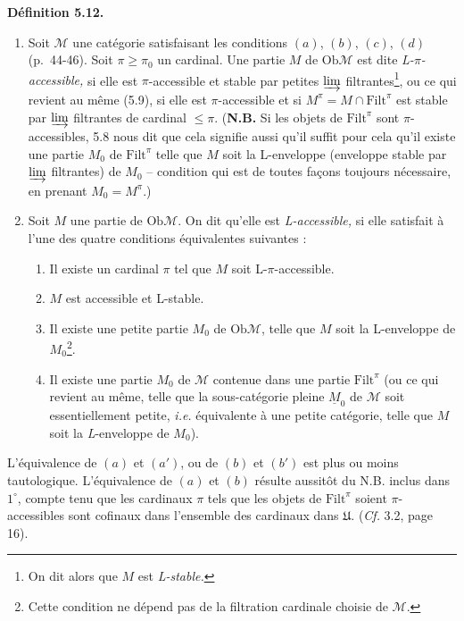 \documentclass[11pt]{article}
\newcommand{\printedpage}[1]{\marginpar{\raggedright\footnotesize p.~#1}}
\newcommand{\msp}[1]{\marginpar{\raggedright\footnotesize [#1]}}
\newcommand{\Filt}{\mathrm{Filt}}
\newcommand{\Ob}{\mathrm{Ob}}
\newcommand{\M}{\mathcal{M}}
\begin{document}
\textbf{Définition 5.12.}
\begin{enumerate}[label={}]
\item[1)] Soit $\M$ une catégorie satisfaisant les conditions $(a)$, $(b)$, $(c)$, $(d)$ (p.~44-46). Soit $\pi \geq \pi_0$ un cardinal. Une partie $M$ de $\Ob\M$ est dite \textit{L-$\pi$-accessible,} si elle est $\pi$-accessible et stable par petites $\varinjlim$ filtrantes\footnote[24]{On dit alors que $M$ est \textit{L-stable.}}, ou ce qui revient au même (5.9), si elle est $\pi$-accessible et si $M^\pi = M \cap \Filt^\pi$ est stable par $\varinjlim$ filtrantes de cardinal $\leq \pi$. (\textbf{N.B.} Si les objets de $\Filt^\pi$ sont $\pi$-accessibles, 5.8 nous dit que cela signifie aussi qu'il suffit pour cela qu'il existe une partie $M_0$ de $\Filt^\pi$ telle que $M$ soit la L-enveloppe (enveloppe stable par $\varinjlim$ filtrantes) de $M_0$ -- condition qui est de toutes façons toujours nécessaire, en prenant $M_0 = M^\pi$.)
\item[2)] Soit $M$ une partie de $\Ob\M$. On dit qu'elle est \textit{L-accessible,} si elle satisfait à l'une des quatre conditions équivalentes suivantes :
\begin{enumerate}[label={}]
\item[\textit{a})] Il existe un cardinal $\pi$ tel que $M$ soit L-$\pi$-accessible.
\item[\textit{a}$'$)] $M$ est accessible et L-stable.
\item[\textit{b})] Il existe une petite partie $M_0$ de $\Ob\M$, telle que $M$ soit la L-enveloppe de $M_0$\footnote[25]{Cette condition ne dépend pas de la filtration cardinale choisie de $\M$.}.
\item[\textit{b}$'$)] Il existe une partie $M_0$ de $\M$ contenue dans une partie $\Filt^\pi$ (ou ce qui revient au même, telle que la sous-catégorie pleine $\underline{M}_0$ de $\M$ soit essentiellement petite, \textit{i.e.} équivalente à une petite catégorie, telle que $M$ soit la \textit{L}-enveloppe de $M_0$).
\end{enumerate}
\end{enumerate}

\printedpage{39}

\msp{page 67}
L'équivalence de $(a)$ et $(a')$, ou de $(b)$ et $(b')$ est plus ou moins tautologique. L'équivalence de $(a)$ et $(b)$ résulte aussitôt du N.B. inclus dans $1^{\circ}$, compte tenu que les cardinaux $\pi$ tels que les objets de $\Filt^{\pi}$ soient $\pi$-accessibles sont cofinaux dans l'ensemble des cardinaux dans $\mathfrak{U}$. (\textit{Cf.} 3.2, page 16).
\end{document}
